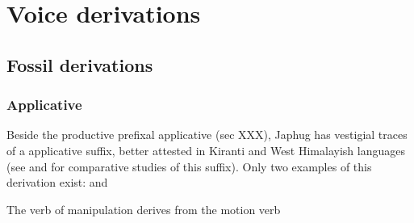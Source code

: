 \chapter{Voice derivations}

\section{Fossil derivations}

\subsection{Applicative }
Beside the productive prefixal  applicative (sec XXX), Japhug has vestigial traces of a  applicative suffix, better attested in Kiranti and West Himalayish languages (see \citealt{michailovsky85dental} and \citealt{jacques16ssuffixes} for comparative studies of this suffix). Only two examples of this derivation exist:  and 

The verb of manipulation  derives from the motion verb 
